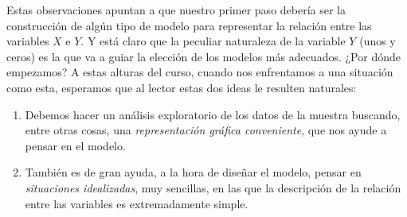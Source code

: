 Estas observaciones apuntan a que nuestro primer paso debería ser la construcción de algún tipo de modelo para representar la relación entre las variables $X$ e $Y$. Y está claro que la peculiar naturaleza de la variable $Y$ (unos y ceros) es la que va a guiar la elección de los modelos más adecuados. ¿Por dónde empezamos? A estas alturas del curso, cuando nos enfrentamos a una situación como esta, esperamos que al lector estas dos ideas le resulten naturales:
\begin{enumerate}
    \item Debemos hacer un análisis exploratorio de los datos de la muestra buscando, entre otras cosas, una {\em representación gráfica conveniente}, que nos ayude a pensar en el modelo.
    \item También es de gran ayuda, a la hora de diseñar el modelo, pensar en {\em situaciones idealizadas}, muy sencillas,  en las que la descripción de la relación entre las variables  es extremadamente simple.
\end{enumerate}

